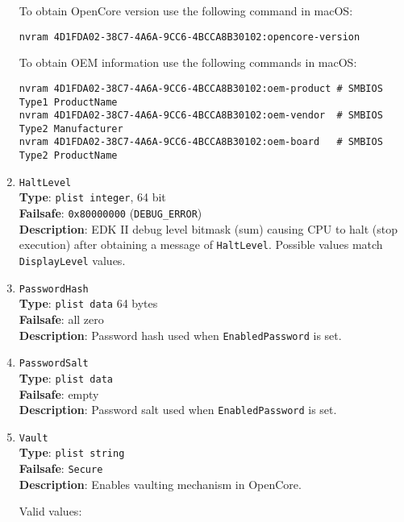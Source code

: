 \documentclass[]{article}
\begin{document}
\begin{enumerate}
  To obtain OpenCore version use the following command in macOS:
\begin{lstlisting}[label=nvramver, style=ocbash]
nvram 4D1FDA02-38C7-4A6A-9CC6-4BCCA8B30102:opencore-version
\end{lstlisting}

  To obtain OEM information use the following commands in macOS:
\begin{lstlisting}[label=nvramoem, style=ocbash]
nvram 4D1FDA02-38C7-4A6A-9CC6-4BCCA8B30102:oem-product # SMBIOS Type1 ProductName
nvram 4D1FDA02-38C7-4A6A-9CC6-4BCCA8B30102:oem-vendor  # SMBIOS Type2 Manufacturer
nvram 4D1FDA02-38C7-4A6A-9CC6-4BCCA8B30102:oem-board   # SMBIOS Type2 ProductName
\end{lstlisting}

\item
  \texttt{HaltLevel}\\
  \textbf{Type}: \texttt{plist\ integer}, 64 bit\\
  \textbf{Failsafe}: \texttt{0x80000000} (\texttt{DEBUG\_ERROR})\\
  \textbf{Description}: EDK II debug level bitmask (sum) causing CPU to
  halt (stop execution) after obtaining a message of \texttt{HaltLevel}.
  Possible values match \texttt{DisplayLevel} values.

\item
  \texttt{PasswordHash}\\
  \textbf{Type}: \texttt{plist\ data} 64 bytes\\
  \textbf{Failsafe}: all zero\\
  \textbf{Description}: Password hash used when \texttt{EnabledPassword} is set.

\item
  \texttt{PasswordSalt}\\
  \textbf{Type}: \texttt{plist\ data}\\
  \textbf{Failsafe}: empty\\
  \textbf{Description}: Password salt used when \texttt{EnabledPassword} is set.

\item \label{securevaulting}
  \texttt{Vault}\\
  \textbf{Type}: \texttt{plist\ string}\\
  \textbf{Failsafe}: \texttt{Secure}\\
  \textbf{Description}: Enables vaulting mechanism in OpenCore.

  Valid values:


\end{enumerate}
\end{document}
